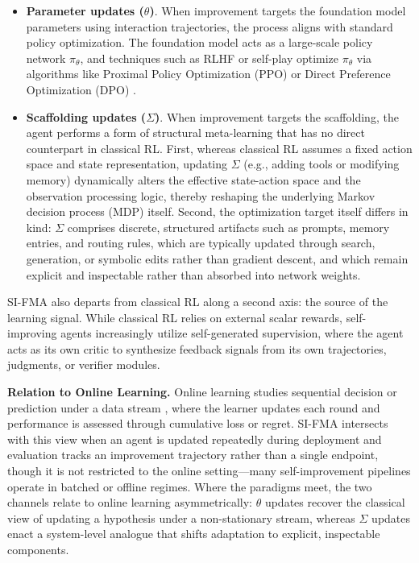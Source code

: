 \documentclass{article}
\begin{document}
\begin{itemize}
\item \textbf{Parameter updates ($\theta$)}.
When improvement targets the foundation model parameters using interaction trajectories, the process aligns with standard policy optimization. The foundation model acts as a large-scale policy network $\pi_{\theta}$, and techniques such as RLHF \citep{christiano2017deep, ouyang2022training} or self-play optimize $\pi_{\theta}$ via algorithms like Proximal Policy Optimization (PPO) \citep{schulman2017proximal} or Direct Preference Optimization (DPO) \citep{rafailov2023direct}.

\item \textbf{Scaffolding updates ($\Sigma$)}.
When improvement targets the scaffolding, the agent performs a form of structural meta-learning that has no direct counterpart in classical RL. First, whereas classical RL assumes a fixed action space and state representation, updating $\Sigma$ (e.g., adding tools or modifying memory) dynamically alters the effective state-action space and the observation processing logic, thereby reshaping the underlying Markov decision process (MDP) itself. Second, the optimization target itself differs in kind: $\Sigma$ comprises discrete, structured artifacts such as prompts, memory entries, and routing rules, which are typically updated through search, generation, or symbolic edits rather than gradient descent, and which remain explicit and inspectable rather than absorbed into network weights.
\end{itemize}

SI-FMA also departs from classical RL along a second axis: the source of the learning signal. While classical RL relies on external scalar rewards, self-improving agents increasingly utilize self-generated supervision, where the agent acts as its own critic to synthesize feedback signals from its own trajectories, judgments, or verifier modules.


\textbf{Relation to Online Learning.}
Online learning \citep{littlestone1988learning, hoi2021online} studies sequential decision or prediction under a data stream \citep{qi2025webrl}, where the learner updates each round and performance is assessed through cumulative loss or regret. SI-FMA intersects with this view when an agent is updated repeatedly during deployment and evaluation tracks an improvement trajectory rather than a single endpoint, though it is not restricted to the online setting—many self-improvement pipelines operate in batched or offline regimes. Where the paradigms meet, the two channels relate to online learning asymmetrically: $\theta$ updates recover the classical view of updating a hypothesis under a non-stationary stream, whereas $\Sigma$ updates enact a system-level analogue that shifts adaptation to explicit, inspectable components.
\end{document}
